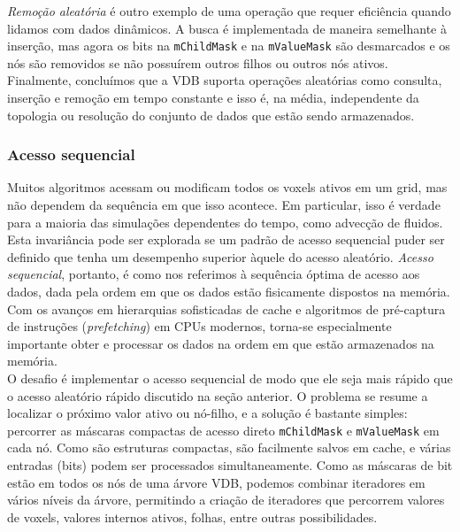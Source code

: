\documentclass[12pt, a4paper, oneside]{book}
\begin{document}
\emph{Remoção aleatória} é outro exemplo de uma operação que requer eficiência quando lidamos com dados dinâmicos. A busca é implementada de maneira semelhante à inserção, mas agora os bits na \texttt{mChildMask} e na \texttt{mValueMask} são desmarcados e os nós são removidos se não possuírem outros filhos ou outros nós ativos. \\

Finalmente, concluímos que a VDB suporta operações aleatórias como consulta, inserção e remoção em tempo constante e isso é, na média, independente da topologia ou resolução do conjunto de dados que estão sendo armazenados.
 
\subsubsection{Acesso sequencial}
Muitos algoritmos acessam ou modificam todos os voxels ativos em um grid, mas não dependem da sequência em que isso acontece. Em particular, isso é verdade para a maioria das simulações dependentes do tempo, como advecção de fluidos. Esta invariância pode ser explorada se um padrão de acesso sequencial puder ser definido que tenha um desempenho superior àquele do acesso aleatório. \emph{Acesso sequencial}, portanto, é como nos referimos à sequência óptima de acesso aos dados, dada pela ordem em que os dados estão fisicamente dispostos na memória. Com os avanços em hierarquias sofisticadas de cache e algoritmos de pré-captura de instruções ({\it prefetching}) em CPUs modernos, torna-se especialmente importante obter e processar os dados na ordem em que estão armazenados na memória. \\

O desafio é implementar o acesso sequencial de modo que ele seja mais rápido que o acesso aleatório rápido discutido na seção anterior. O problema se resume a localizar o próximo valor ativo ou nó-filho, e a solução é bastante simples: percorrer as máscaras compactas de acesso direto \texttt{mChildMask} e \texttt{mValueMask} em cada nó. Como são estruturas compactas, são facilmente salvos em cache, e várias entradas (bits) podem ser processados simultaneamente. Como as máscaras de bit estão em todos os nós de uma árvore VDB, podemos combinar iteradores em vários níveis da árvore, permitindo a criação de iteradores que percorrem valores de voxels, valores internos ativos, folhas, entre outras possibilidades.
\end{document}
